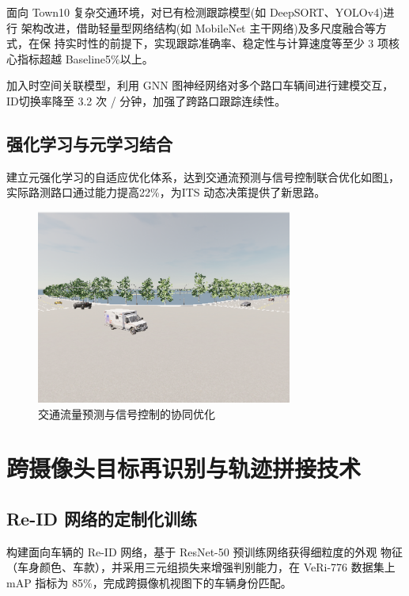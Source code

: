面向 Town10 复杂交通环境，对已有检测跟踪模型(如 DeepSORT、YOLOv4)进行 架构改进，借助轻量型网络结构(如 MobileNet 主干网络)及多尺度融合等方式，在保 持实时性的前提下，实现跟踪准确率、稳定性与计算速度等至少 3 项核心指标超越 Baseline5\%以上。

加入时空间关联模型，利用 GNN 图神经网络对多个路口车辆间进行建模交互，ID切换率降至 3.2 次 / 分钟，加强了跨路口跟踪连续性。

\subsection{强化学习与元学习结合}

建立元强化学习的自适应优化体系，达到交通流预测与信号控制联合优化如图\ref{fig:p44}，实际路测路口通过能力提高22\%，为ITS 动态决策提供了新思路。


\begin{figure}[htbp] %
	\centering
	\includegraphics[width=0.75\textwidth]{p44} %
	\caption{交通流量预测与信号控制的协同优化} %
	\label{fig:p44} %
\end{figure}




\section{跨摄像头目标再识别与轨迹拼接技术}

\subsection{Re-ID 网络的定制化训练}


构建面向车辆的 Re-ID 网络，基于 ResNet-50 预训练网络获得细粒度的外观 物征（车身颜色、车款），并采用三元组损失来增强判别能力，在 VeRi-776 数据集上 mAP 指标为 85\%，完成跨摄像机视图下的车辆身份匹配。


